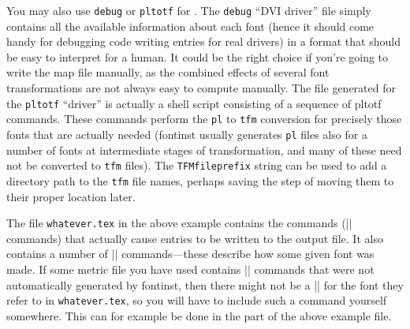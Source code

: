 \documentclass[a4paper]{ltxguide}
\newcommand*{\meta}{\m}
\newcommand*{\setfilename}[1]{\texttt{#1}}
\newcommand*{\setpackagename}[1]{\textsf{#1}}
\newcommand{\fontinst}{\setpackagename{font\-inst}\xspace}
\newcommand{\pl} {\setfilename{pl}\xspace}
\newcommand{\tfm}{\setfilename{tfm}\xspace}
\newcommand{\pltotf}{\setpackagename{pltotf}\xspace}
\begin{document}
You may also use \texttt{debug} or \texttt{pltotf} for \meta{driver name}. 
The \texttt{debug} ``DVI driver'' file simply contains all the available 
information about each font (hence it should come handy for debugging 
code writing entries for real drivers) in a format that should be easy 
to interpret for a human. It could be the right choice if you're going 
to write the map file manually, as the combined effects of several 
font transformations are not always easy to compute manually. The 
file generated for the \texttt{pltotf} ``driver'' is actually a shell 
script consisting of a sequence of \pltotf commands. These commands 
perform the \pl to \tfm conversion for precisely those fonts that are 
actually needed (\fontinst usually generates \pl files also for a 
number of fonts at intermediate stages of transformation, and many of 
these need not be converted to \tfm files). The \texttt{TFMfileprefix} 
string can be used to add a directory path to the \tfm file names, 
perhaps saving the step of moving them to their proper location later.

The file \texttt{whatever.tex} in the above example contains the 
commands (|\makemapentry| commands) that actually cause entries to be 
written to the output file. It also contains a number of |\storemapdata| 
commands---these describe how some given font was made. If some 
metric file you have used contains |\setrawglyph| commands that were 
not automatically generated by \fontinst, then there might 
not be a |\storemapdata| for the font they refer to in 
\texttt{whatever.tex}, so you will have to include such a command 
yourself somewhere. This can for example be done in the \meta{general 
settings} part of the above example file.
\end{document}

